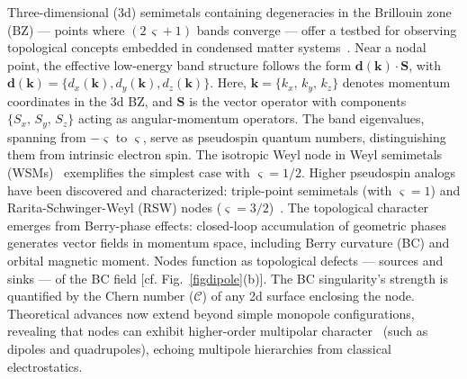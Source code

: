 \documentclass[aps,prb,onecolumn, footinbib, 10pt]{revtex4-2}
\begin{document}
Three-dimensional (3d) semimetals containing degeneracies in the Brillouin zone (BZ) --- points where $(2\, \varsigma + 1)$ bands converge --- offer a testbed for observing topological concepts embedded in condensed matter systems~\cite{burkov11_Weyl, hosur1, armitage_review, hosur-review, yan17_topological, ips-kush-review, bernevig, bernevig2, grushin-multifold, claudia-multifold}. Near a nodal point, the effective low-energy band structure follows the form
$ \boldsymbol d( \boldsymbol{k} ) \cdot \boldsymbol {S } $, with
$\boldsymbol d( \boldsymbol{k} ) = 
\lbrace d_x ( \boldsymbol{k} ) , d_y ( \boldsymbol{k} ) , d_z ( \boldsymbol{k} )  
 \rbrace.$
Here, $\boldsymbol k = \lbrace k_x, \,k_y, \,  k_z  \rbrace$ denotes momentum coordinates in the 3d BZ, and $\boldsymbol {S}$ is the vector operator with components $ \lbrace S_x, \,S_y, \,  S_z  \rbrace $ acting as angular-momentum operators. The band eigenvalues, spanning from $- \varsigma $ to $ \varsigma $, serve as pseudospin quantum numbers, distinguishing them from intrinsic electron spin.
The isotropic Weyl node in Weyl semimetals (WSMs)~\cite{burkov11_Weyl, armitage_review, yan17_topological} exemplifies the simplest case with $\varsigma = 1/2$. Higher pseudospin analogs have been discovered and characterized: triple-point semimetals (with $\varsigma = 1 $) and Rarita-Schwinger-Weyl (RSW) nodes ($\varsigma = 3/2$)~\cite{bernevig, long, isobe-fu,  tang2017_multiple, ma2021_observation, prb108035428, grushin-multifold, ips-rsw-ph, ips-shreya, ips-exact-rsw}. The topological character emerges from Berry-phase effects: closed-loop accumulation of geometric phases generates vector fields in momentum space, including Berry curvature (BC) and orbital magnetic moment. Nodes function as topological defects --- sources and sinks --- of the BC field [cf. Fig.~\ref{figdipole}(b)]. The BC singularity's strength is quantified by the Chern number ($\mathcal C$) of any 2d surface enclosing the node. Theoretical advances now extend beyond simple monopole configurations, revealing that nodes can exhibit higher-order multipolar character~\cite{twoband-dipole, graf-hopf, hopf2, *hopf3} (such as dipoles and quadrupoles), echoing multipole hierarchies from classical electrostatics.
\end{document}
